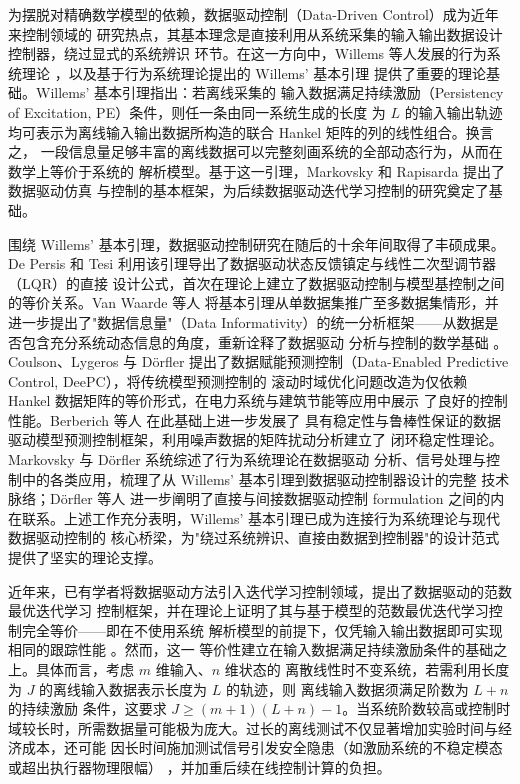 为摆脱对精确数学模型的依赖，数据驱动控制（Data-Driven Control）成为近年来控制领域的
研究热点，其基本理念是直接利用从系统采集的输入输出数据设计控制器，绕过显式的系统辨识
环节。在这一方向中，Willems 等人发展的行为系统理论  ，以及基于行为系统理论提出的 Willems' 基本引理  提供了重要的理论基础。Willems' 基本引理指出：若离线采集的
输入数据满足持续激励（Persistency of Excitation, PE）条件，则任一条由同一系统生成的长度
为 $L$ 的输入输出轨迹均可表示为离线输入输出数据所构造的联合 Hankel 矩阵的列的线性组合。换言之，
一段信息量足够丰富的离线数据可以完整刻画系统的全部动态行为，从而在数学上等价于系统的
解析模型。基于这一引理，Markovsky 和 Rapisarda  提出了数据驱动仿真
与控制的基本框架，为后续数据驱动迭代学习控制的研究奠定了基础。

围绕 Willems' 基本引理，数据驱动控制研究在随后的十余年间取得了丰硕成果。De Persis 和 Tesi
 利用该引理导出了数据驱动状态反馈镇定与线性二次型调节器（LQR）的直接
设计公式，首次在理论上建立了数据驱动控制与模型基控制之间的等价关系。Van Waarde 等人
 将基本引理从单数据集推广至多数据集情形，并进一步提出了"数据信息量"（Data
Informativity）的统一分析框架——从数据是否包含充分系统动态信息的角度，重新诠释了数据驱动
分析与控制的数学基础 。Coulson、Lygeros 与 Dörfler 
提出了数据赋能预测控制（Data-Enabled Predictive Control, DeePC），将传统模型预测控制的
滚动时域优化问题改造为仅依赖 Hankel 数据矩阵的等价形式，在电力系统与建筑节能等应用中展示
了良好的控制性能。Berberich 等人  在此基础上进一步发展了
具有稳定性与鲁棒性保证的数据驱动模型预测控制框架，利用噪声数据的矩阵扰动分析建立了
闭环稳定性理论。Markovsky 与 Dörfler  系统综述了行为系统理论在数据驱动
分析、信号处理与控制中的各类应用，梳理了从 Willems' 基本引理到数据驱动控制器设计的完整
技术脉络；Dörfler 等人  进一步阐明了直接与间接数据驱动控制
 formulation 之间的内在联系。上述工作充分表明，Willems' 基本引理已成为连接行为系统理论与现代数据驱动控制的
核心桥梁，为"绕过系统辨识、直接由数据到控制器"的设计范式提供了坚实的理论支撑。

近年来，已有学者将数据驱动方法引入迭代学习控制领域，提出了数据驱动的范数最优迭代学习
控制框架，并在理论上证明了其与基于模型的范数最优迭代学习控制完全等价——即在不使用系统
解析模型的前提下，仅凭输入输出数据即可实现相同的跟踪性能 。然而，这一
等价性建立在输入数据满足持续激励条件的基础之上。具体而言，考虑 $m$ 维输入、$n$ 维状态的
离散线性时不变系统，若需利用长度为 $J$ 的离线输入数据表示长度为 $L$ 的轨迹，则 离线输入数据须满足阶数为 $L+n$ 的持续激励
条件，这要求 $J\geq (m+1)(L+n)-1$。当系统阶数较高或控制时域较长时，所需数据量可能极为庞大。过长的离线测试不仅显著增加实验时间与经济成本，还可能
因长时间施加测试信号引发安全隐患（如激励系统的不稳定模态或超出执行器物理限幅）
，并加重后续在线控制计算的负担。

